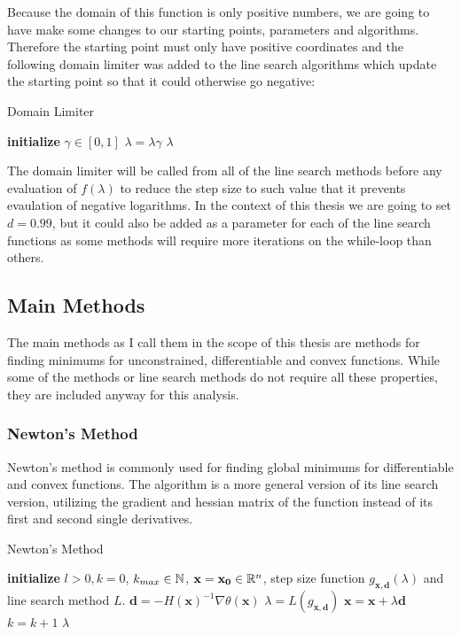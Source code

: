 \documentclass[a4paper,english,titlepage,12pt]{article}
\newcommand{\vect}[1]{\ensuremath{\mathbf{#1}}}
\newcommand{\norm}[1]{\ensuremath\Vert #1 \Vert}
\newcommand{\R}{\ensuremath\mathbb{R}}
\newcommand{\N}{\ensuremath\mathbb{N}}
\begin{document}
Because the domain of this function is only positive numbers, we are going to have make some changes to our starting points, parameters and algorithms. Therefore the starting point must only have positive coordinates and the following domain limiter was added to the line search algorithms which update the starting point so that it could otherwise go negative:

\begin{algorithm}[H]
\caption{Domain Limiter}
\label{alg_domain_limiter}
\begin{algorithmic}[1]
\STATE \textbf{initialize} $\gamma \in [0, 1]$
\WHILE{min $(\vect{x} + \lambda \vect{d}) <= 0$}
    \STATE $\lambda = \lambda \gamma$
\ENDWHILE
\RETURN $\lambda$
\end{algorithmic}
\end{algorithm}

The domain limiter will be called from all of the line search methods before any evaluation of $f(\lambda)$ to reduce the step size to such value that it prevents evaulation of negative logarithms. In the context of this thesis we are going to set $d = 0.99$, but it could also be added as a parameter for each of the line search functions as some methods will require more iterations on the while-loop than others.


\subsection{Main Methods}


The main methods as I call them in the scope of this thesis are methods for finding minimums for unconstrained, differentiable and convex functions. While some of the methods or line search methods do not require all these properties, they are included anyway for this analysis.


\subsubsection{Newton's Method}


Newton's method is  commonly used for finding global minimums for differentiable and convex functions. The algorithm is a more general version of its line search version, utilizing the gradient and hessian matrix of the function instead of its first and second single derivatives.

\begin{algorithm}[H]
\caption{Newton's Method}
\label{alg_newtons}
\begin{algorithmic}[1]
\STATE \textbf{initialize} $l > 0, k = 0$, $k_{max} \in \N$, $\vect{x} = \vect{x_0} \in \R^n$, step size function $g_{\vect{x}, \vect{d}}(\lambda)$ and line search method $L$.
\WHILE{$\norm{\nabla \theta(\vect{x})} > l$ \AND $k < k_{max}$}
    \STATE $\vect{d} = -H(\vect{x})^{-1} \nabla \theta(\vect{x})$
    \STATE $\lambda = L(g_{\vect{x}, \vect{d}})$
    \STATE $\vect{x} = \vect{x} + \lambda \vect{d}$
    \STATE $k = k + 1$
\ENDWHILE
\RETURN $\lambda$
\end{algorithmic}
\end{algorithm}
\end{document}
